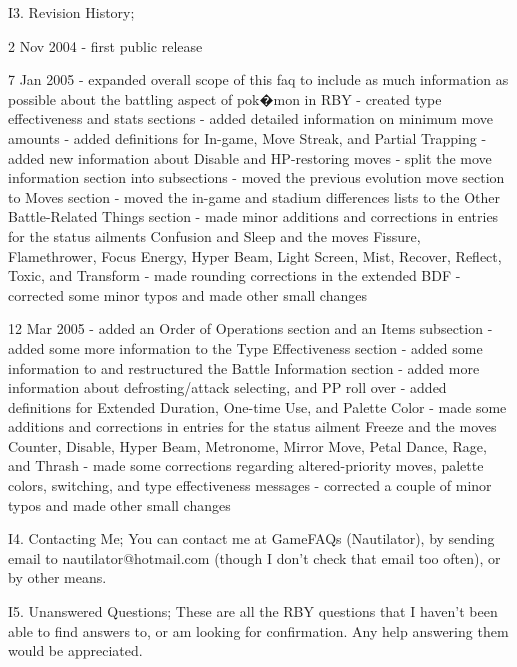 \documentclass[reprint, aps, prl, paper=A4]{revtex4-1}
\begin{document}
I3. Revision History;

      2 Nov 2004 - first public release

      7 Jan 2005 - expanded overall scope of this faq to include as much information as
                   possible about the battling aspect of pok�mon in RBY
                 - created type effectiveness and stats sections
                 - added detailed information on minimum move amounts
                 - added definitions for In-game, Move Streak, and Partial Trapping
                 - added new information about Disable and HP-restoring moves
                 - split the move information section into subsections
                 - moved the previous evolution move section to Moves section
                 - moved the in-game and stadium differences lists to the Other Battle-Related
                   Things section
                 - made minor additions and corrections in entries for the status ailments
                   Confusion and Sleep and the moves Fissure, Flamethrower, Focus Energy, Hyper
                   Beam, Light Screen, Mist, Recover, Reflect, Toxic, and Transform
                 - made rounding corrections in the extended BDF
                 - corrected some minor typos and made other small changes

     12 Mar 2005 - added an Order of Operations section and an Items subsection
                 - added some more information to the Type Effectiveness section
                 - added some information to and restructured the Battle Information section
                 - added more information about defrosting/attack selecting, and PP roll over
                 - added definitions for Extended Duration, One-time Use, and Palette Color
                 - made some additions and corrections in entries for the status ailment Freeze
                   and the moves Counter, Disable, Hyper Beam, Metronome, Mirror Move, Petal
                   Dance, Rage, and Thrash
                 - made some corrections regarding altered-priority moves, palette colors,
                   switching, and type effectiveness messages
                 - corrected a couple of minor typos and made other small changes


I4. Contacting Me;
You can contact me at GameFAQs (Nautilator), by sending email to nautilator@hotmail.com (though
I don't check that email too often), or by other means.


I5. Unanswered Questions;
These are all the RBY questions that I haven't been able to find answers to, or am looking for
confirmation. Any help answering them would be appreciated.
\end{document}
